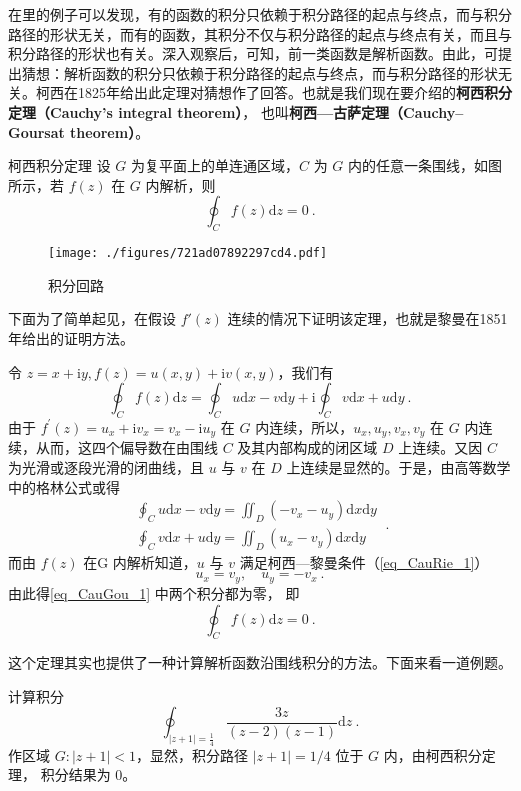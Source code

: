 


在里的例子可以发现，有的函数的积分只依赖于积分路径的起点与终点，而与积分路径的形状无关，而有的函数，其积分不仅与积分路径的起点与终点有关，而且与积分路径的形状也有关。深入观察后，可知，前一类函数是解析函数。由此，可提出猜想：解析函数的积分只依赖于积分路径的起点与终点，而与积分路径的形状无关。柯西在1825年给出此定理对猜想作了回答。也就是我们现在要介绍的\textbf{柯西积分定理（Cauchy's integral theorem）}， 也叫\textbf{柯西—古萨定理（Cauchy–Goursat theorem）}。

\begin{theorem}{柯西积分定理}
设 $G $ 为复平面上的单连通区域，$C $ 为 $G $ 内的任意一条围线，如图所示，若 $f (z)$ 在 $G $ 内解析，则
\begin{equation}
\oint_{C} f(z) \mathrm{d} z=0~.
\end{equation}
\begin{figure}[ht]
\centering
\texttt{[image: ./figures/721ad07892297cd4.pdf]}
\caption{积分回路} \label{fig_CauGou_1}
\end{figure}

下面为了简单起见，在假设 $f'(z)$ 连续的情况下证明该定理，也就是黎曼在1851年给出的证明方法。

令 $z=x+\mathrm{i} y, f(z)=u(x, y)+\mathrm{i} v(x, y)$，我们有
\begin{equation}
\oint_{C} f(z) \mathrm{d} z=\oint_{C} u \mathrm{d} x-v \mathrm{d} y+\mathrm{i} \oint_{C} v \mathrm{d} x+u \mathrm{d} y~.
\end{equation}
由于 $f^{\prime}(z)=u_{x}+\mathrm{i} v_{x}=v_{x}-\mathrm{i} u_{y}$ 在 $G $ 内连续，所以，$u_{x}, u_{y}, v_{x}, v_{y}$ 在 $G $ 内连续，从而，这四个偏导数在由围线 $C$ 及其内部构成的闭区域 $D $ 上连续。又因 $C $ 为光滑或逐段光滑的闭曲线，且 $u $ 与 $v $ 在 $D $ 上连续是显然的。于是，由高等数学中的格林公式或得
\begin{equation}\label{eq_CauGou_1}
\begin{aligned}\oint_C u \mathrm{d} x-v \mathrm{d} y=\iint_{D}\left(-v_{x}-u_{y}\right) \mathrm{d} x \mathrm{d} y \\ \oint_C v \mathrm{d} x+u \mathrm{d} y=\iint_{D}\left(u_{x}-v_{y}\right) \mathrm{d} x \mathrm{d} y\end{aligned}~.
\end{equation}
而由 $ f (z)$ 在G 内解析知道，$u$ 与 $v$ 满足柯西—黎曼条件（\autoref{eq_CauRie_1}）
\begin{equation}
u_{x}=v_{y}, \quad u_{y}=-v_{x}~.
\end{equation}
由此得\autoref{eq_CauGou_1} 中两个积分都为零， 即
\begin{equation}
\oint_{C} f(z) \mathrm{d} z=0~.
\end{equation}
\end{theorem}
这个定理其实也提供了一种计算解析函数沿围线积分的方法。下面来看一道例题。
\begin{example}{}
计算积分
\begin{equation}
\oint_{|z+1|=\frac{1}{4}} \frac{3 z}{(z-2)(z-1)} \mathrm{d} z~.
\end{equation}
作区域 $G:|z+1|<1$，显然，积分路径 $|z+1|=1/4$ 位于 $G$ 内，由柯西积分定理， 积分结果为 0。
\end{example}
